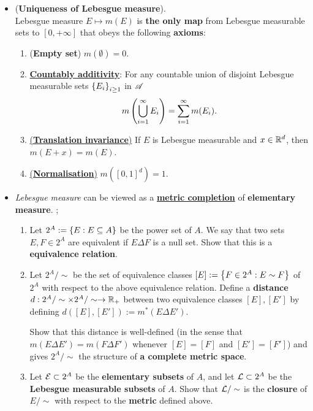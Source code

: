 \documentclass[11pt]{article}
\begin{document}
\begin{itemize}
\item \begin{proposition} (\textbf{Uniqueness of Lebesgue measure}).\\
Lebesgue measure $E \mapsto m(E)$ is \textbf{the only map} from Lebesgue measurable sets to $[0, +\infty]$ that obeys the following \textbf{axioms}:
\begin{enumerate}
\item (\textbf{Empty set})  $m(\emptyset) = 0$.
\item \underline{\textbf{Countably additivity}}:  For any countable union of disjoint Lebesgue measurable sets $\left\{E_{i}\right\}_{i\ge 1}$ in ${\mathscr A}$ 
\begin{align*}
 m\left(\bigcup_{i=1}^{\infty}E_{i}\right) =  \sum_{i=1}^{\infty}m(E_{i}).
\end{align*}
\item \underline{(\textbf{Translation invariance})} If $E$ is Lebesgue measurable and $x \in {\mathbb R}^d$, then $m(E + x) = m(E)$.
\item \underline{(\textbf{Normalisation})}  $m([0, 1]^d) = 1$.
\end{enumerate}
\end{proposition}


\item \begin{exercise}
\emph{Lebesgue measure} can be viewed as a \underline{\textbf{metric completion}} of \textbf{elementary measure}. \citep{tao2011introduction};
\begin{enumerate}
\item Let $2^A := \left\{E : E \subseteq A\right\}$ be the power set of $A$. We say that two sets $E, F \in 2^A$ are equivalent if $E \Delta F$ is a null set. Show that this is a \textbf{equivalence relation}.
\item Let $2^A / \sim$ be the set of equivalence classes $[E] := \left\{F \in 2^A : E \sim F\right\}$ of $2^A$ with respect to the above equivalence relation. Define a \textbf{distance} $d: 2^A /\sim \times 2^A/\sim \rightarrow {\mathbb R}_{+}$ between two equivalence classes $[E], [E']$ by defining $d([E], [E']) := m^{*}(E \Delta E')$. 

Show that this distance is well-defined (in the sense that $m(E \Delta E') = m(F \Delta F')$ whenever $[E] = [F]$ and $[E'] = [F']$) and gives $2^A /\sim$ the structure of \textbf{a complete metric space}.
\item Let ${\mathcal E} \subset 2^A$ be the \textbf{elementary subsets} of $A$, and let ${\mathcal L} \subset 2^A$ be the \textbf{Lebesgue measurable subsets} of $A$. Show that ${\mathcal L}/\sim$
is the \textbf{closure} of $E/\sim$ with respect to the \textbf{metric} defined above.


\end{enumerate}
\end{exercise}
\end{itemize}
\end{document}

